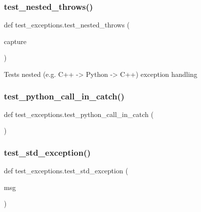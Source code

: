 \subsubsection{\texorpdfstring{test\_nested\_throws()}{test\_nested\_throws()}}
{\footnotesize\ttfamily def test\+\_\+exceptions.\+test\+\_\+nested\+\_\+throws (\begin{DoxyParamCaption}\item[{}]{capture }\end{DoxyParamCaption})}

\begin{DoxyVerb}Tests nested (e.g. C++ -> Python -> C++) exception handling\end{DoxyVerb}
 \mbox{\label{namespacetest__exceptions_ae6a0bbcfa4d024fd8de0e89bc1bae224}} 
\subsubsection{\texorpdfstring{test\_python\_call\_in\_catch()}{test\_python\_call\_in\_catch()}}
{\footnotesize\ttfamily def test\+\_\+exceptions.\+test\+\_\+python\+\_\+call\+\_\+in\+\_\+catch (\begin{DoxyParamCaption}{ }\end{DoxyParamCaption})}

\mbox{\label{namespacetest__exceptions_a8003f21452ee6d48d5a28cb47ae16bde}} 
\subsubsection{\texorpdfstring{test\_std\_exception()}{test\_std\_exception()}}
{\footnotesize\ttfamily def test\+\_\+exceptions.\+test\+\_\+std\+\_\+exception (\begin{DoxyParamCaption}\item[{}]{msg }\end{DoxyParamCaption})}

